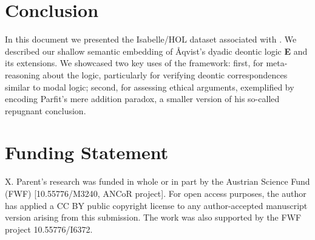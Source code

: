 \documentclass[11pt,a4paper]{article}
\begin{document}
\section{Conclusion}

In this document we presented the Isabelle/HOL dataset associated with
\cite{J68}. We described our shallow semantic embedding of \AA qvist's dyadic deontic logic  {\bf E} and its extensions. We showcased two key uses of the framework: first, for meta-reasoning about the logic, particularly for verifying deontic correspondences similar to modal logic; second, for assessing ethical arguments, exemplified by encoding Parfit's mere addition paradox, a smaller version of his so-called repugnant conclusion.


\section*{Funding Statement} X. Parent's research was funded in whole or in part by the Austrian Science Fund (FWF) [10.55776/M3240, ANCoR project]. For open access purposes, the author has applied a CC BY public copyright license to any author-accepted manuscript version arising from this submission. The work was also supported by the FWF project 10.55776/I6372.


\end{document}
